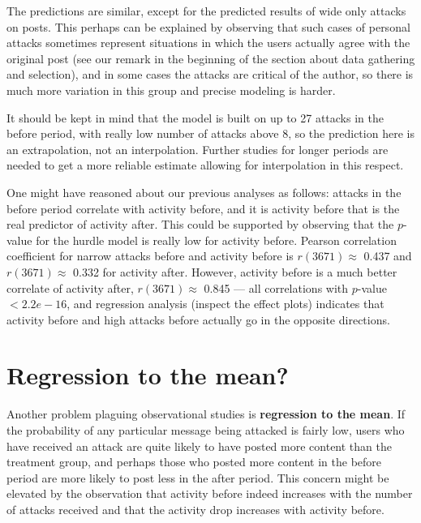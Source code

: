 \documentclass[10pt,]{scrartcl}
\begin{document}
The predictions are similar, except for the predicted results of wide
only attacks on posts. This perhaps can be explained by observing that
such cases of personal attacks sometimes represent situations in which
the users actually agree with the original post (see our remark in the
beginning of the section about data gathering and selection), and in
some cases the attacks are critical of the author, so there is much more
variation in this group and precise modeling is harder.

It should be kept in mind that the model is built on up to 27 attacks in
the \textsf{before} period, with really low number of attacks above 8,
so the prediction here is an extrapolation, not an interpolation.
Further studies for longer periods are needed to get a more reliable
estimate allowing for interpolation in this respect.

One might have reasoned about our previous analyses as follows: attacks
in the before period correlate with activity before, and it is activity
before that is the real predictor of activity after. This could be
supported by observing that the \(p\)-value for the hurdle model is
really low for activity before. Pearson correlation coefficient for
narrow attacks before and activity before is \(r(3671)\approx\) 0.437
and \(r(3671)\approx\) 0.332 for activity after. However, activity
before is a much better correlate of activity after, \(r(3671)\approx\)
0.845 --- all correlations with \(p\)-value \(<2.2e-16\), and regression
analysis (inspect the effect plots) indicates that activity before and
high attacks before actually go in the opposite directions.

\section{Regression to the mean?}

Another problem plaguing observational studies is
\textbf{regression to the mean}. If the probability of any particular
message being attacked is fairly low, users who have received an attack
are quite likely to have posted more content than the treatment group,
and perhaps those who posted more content in the \textsf{before} period
are more likely to post less in the \textsf{after} period. This concern
might be elevated by the observation that activity before indeed
increases with the number of attacks received and that the activity drop
increases with \textsf{activity} before.
\end{document}
